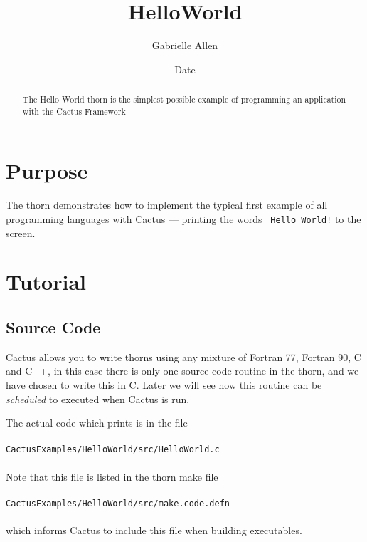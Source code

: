 \documentclass{article}
\begin{document}
\title{HelloWorld}
\author{Gabrielle Allen}
\date{$ $Date$ $}

\maketitle


\begin{abstract}
The Hello World thorn is the simplest possible example of programming
an application with the Cactus Framework
\end{abstract}

\section{Purpose}

The thorn demonstrates how to implement the typical first example of
all programming languages with Cactus --- printing the words {\tt
Hello World!} to the screen.

\section{Tutorial}

\subsection{Source Code}

Cactus allows you to write thorns using any mixture of Fortran 77,
Fortran 90, C and C++, in this case there is only one source code
routine in the thorn, and we have chosen to write this in C. Later we
will see how this routine can be {\it scheduled} to executed when
Cactus is run.

The actual code which prints is in the file \\ \\

{\tt CactusExamples/HelloWorld/src/HelloWorld.c} \\ \\

Note that this file is listed in the thorn make file \\ \\ 

{\tt CactusExamples/HelloWorld/src/make.code.defn} \\ \\

which informs Cactus to include this file when building executables.
\end{document}
